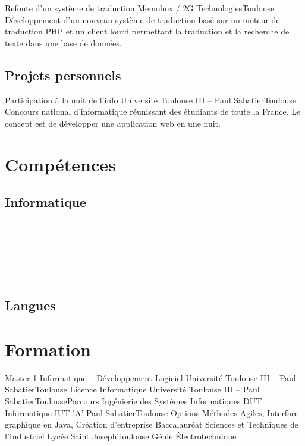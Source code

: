 \documentclass{my_cv_bis}
\begin{document}
	{ Refonte d’un système de traduction }
	{Memobox / 2G Technologies}{Toulouse}
	{Développement d'un nouveau système de traduction basé sur un moteur de traduction PHP et un client lourd
	permettant la traduction et la recherche de texte dans une base de données.  } {}
	\subsection{Projets personnels}
	{Participation à la nuit de l'info}
	{Université Toulouse III -- Paul Sabatier}{Toulouse}
	{ Concours national d’informatique réunissant des étudiants de toute la France. Le concept est de développer une application web en une nuit.} 
	{}
	\vspace{-20px}
\section{Compétences}
		\subsection{Informatique}
		\\
		\\
		\\
		\\
		\\
\vspace{-9px}
		\subsection{Langues}
	\vspace{-10px}
\section{Formation}
	{Master 1 Informatique -- Développement Logiciel}
	{Université Toulouse III -- Paul Sabatier}{Toulouse}{}{}
	{Licence Informatique}
	{Université Toulouse III -- Paul Sabatier}{Toulouse}{Parcours Ingénierie des Systèmes Informatiques}{}
	{DUT Informatique}
	{IUT 'A' Paul Sabatier}{Toulouse}
	{Options Méthodes Agiles, Interface graphique en Java, Création d'entreprise}
	{}
	{Baccalauréat Sciences et Techniques de l'Industriel}
	{Lycée Saint Joseph}{Toulouse}
	{Génie Électrotechnique}{}
	\vspace{-20px}
\end{document}
